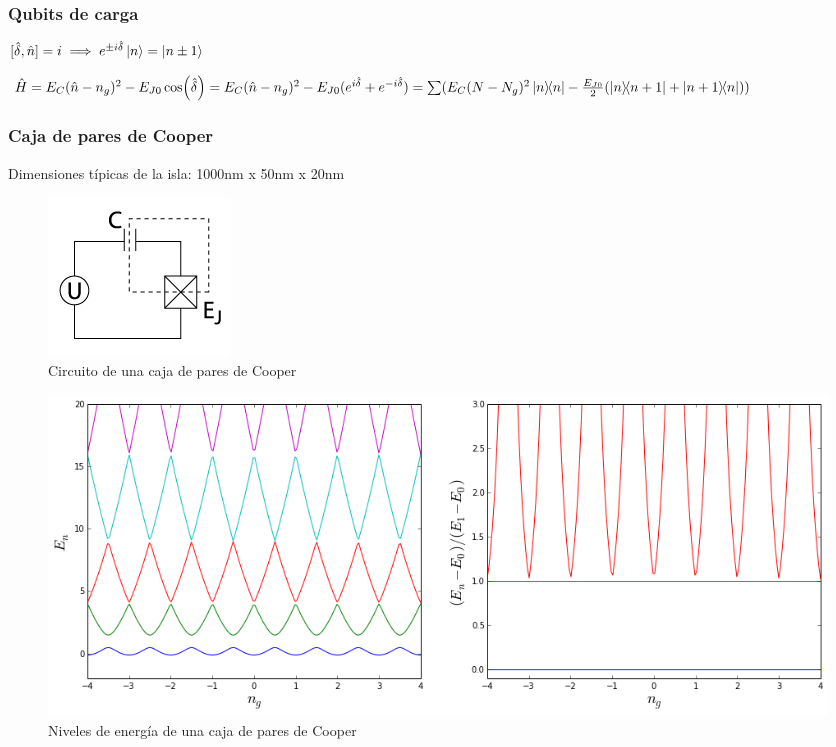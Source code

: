 \documentclass[xetex,mathserif,serif]{beamer}
\begin{document}
\begin{frame}
    \frametitle{Qubits de carga}

$[\hat{\delta},\hat{n}]=i \implies e^{\pm i \hat{\delta}} \ket{n} = \ket{n\pm 1}$

$\hat{H} = E_C (\hat{n}-n_g)^2 - E_{J0} \cos(\hat{\delta}) =
 E_C (\hat{n}-n_g)^2 - E_{J0} (e^{i \hat{\delta}} + e^{-i \hat{\delta}}) =
 \sum(E_C(N-N_g)^2 \ketbra{n}{n} - \frac{E_{J0}}{2}(\ketbra{n}{n+1}+
 \ketbra{n+1}{n}))$

\end{frame}
 
\begin{frame}
 \frametitle{Caja de pares de Cooper}

Dimensiones típicas de la isla: 1000nm x 50nm x 20nm

\begin{figure}[H]
\centering \includegraphics[width=0.3\linewidth]{md/Avance1/cooperpairbox.png}
\caption{Circuito de una caja de pares de Cooper}
\label{fig:cooperpairboxcircuit}
\end{figure}

\begin{figure}[H]
\centering \includegraphics[width=0.3\linewidth]{md/Avance1/cooperenergy.png}
\caption{Niveles de energía de una caja de pares de Cooper}
\label{fig:cooperpairboxenergy}
\end{figure}

\end{frame}
\end{document}
